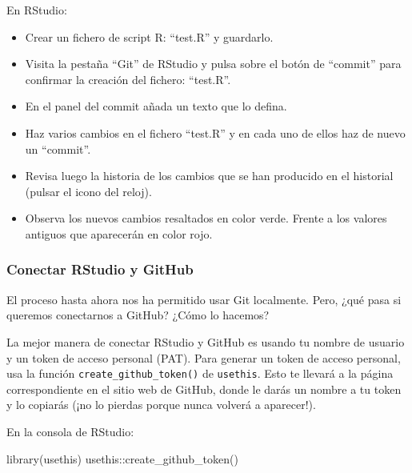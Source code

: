 \documentclass[
  letterpaper,
  DIV=11,
  numbers=noendperiod]{scrreprt}
\newenvironment{Shaded}{\begin{snugshade}}{\end{snugshade}}
\newcommand{\FunctionTok}[1]{\textcolor[rgb]{0.28,0.35,0.67}{#1}}
\newcommand{\NormalTok}[1]{\textcolor[rgb]{0.00,0.23,0.31}{#1}}
\newcommand{\SpecialCharTok}[1]{\textcolor[rgb]{0.37,0.37,0.37}{#1}}
\begin{document}
En RStudio:

\begin{itemize}
\item
  Crear un fichero de script R: ``test.R'' y guardarlo.
\item
  Visita la pestaña ``Git'' de RStudio y pulsa sobre el botón de
  ``commit'' para confirmar la creación del fichero: ``test.R''.
\item
  En el panel del commit añada un texto que lo defina.
\item
  Haz varios cambios en el fichero ``test.R'' y en cada uno de ellos haz
  de nuevo un ``commit''.
\item
  Revisa luego la historia de los cambios que se han producido en el
  historial (pulsar el icono del reloj).
\item
  Observa los nuevos cambios resaltados en color verde. Frente a los
  valores antiguos que aparecerán en color rojo.
\end{itemize}

\hypertarget{conectar-rstudio-y-github}{%
\subsubsection{Conectar RStudio y
GitHub}\label{conectar-rstudio-y-github}}

El proceso hasta ahora nos ha permitido usar Git localmente. Pero, ¿qué
pasa si queremos conectarnos a GitHub? ¿Cómo lo hacemos?

La mejor manera de conectar RStudio y GitHub es usando tu nombre de
usuario y un token de acceso personal (PAT). Para generar un token de
acceso personal, usa la función \texttt{create\_github\_token()} de
\texttt{usethis}. Esto te llevará a la página correspondiente en el
sitio web de GitHub, donde le darás un nombre a tu token y lo copiarás
(¡no lo pierdas porque nunca volverá a aparecer!).

En la consola de RStudio:

\begin{Shaded}
\begin{Highlighting}[]
\FunctionTok{library}\NormalTok{(usethis)}
\NormalTok{usethis}\SpecialCharTok{::}\FunctionTok{create\_github\_token}\NormalTok{()}
\end{Highlighting}
\end{Shaded}
\end{document}
